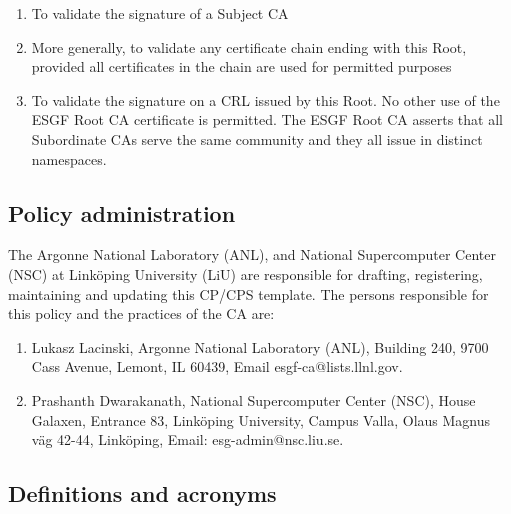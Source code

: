 \begin{enumerate}
\item
  
  To validate the signature of a Subject CA
  
\item
  
  More generally, to validate any certificate chain ending with this
  Root, provided all certificates in the chain are used for permitted
  purposes
  
\item
  
  To validate the signature on a CRL issued by this Root. No other use
  of the ESGF Root CA certificate is permitted. The ESGF Root CA
  asserts that all Subordinate CAs serve the same community and they all
  issue in distinct namespaces.
  
\end{enumerate}

\subsection{Policy administration}\label{policy-administration}

The Argonne National Laboratory (ANL), and National Supercomputer Center (NSC) at Link\"oping University (LiU) are responsible for drafting,
registering, maintaining and updating this CP/CPS template. The persons
responsible for this policy and the practices of the CA are: 
\begin{enumerate}
\item Lukasz Lacinski, Argonne National Laboratory (ANL), Building 240, 9700 Cass Avenue, Lemont, IL 60439, Email esgf-ca@lists.llnl.gov.
\item Prashanth Dwarakanath, National Supercomputer Center (NSC), House Galaxen, Entrance 83, Link\"oping University, Campus Valla, Olaus Magnus v\"ag 42-44, Link\"oping, Email: esg-admin@nsc.liu.se.
\end{enumerate}

\subsection{Definitions and acronyms}\label{definitions-and-acronyms}

